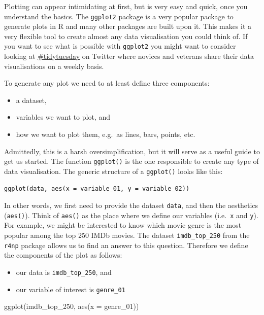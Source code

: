\documentclass[
]{book}
\newenvironment{Shaded}{\begin{snugshade}}{\end{snugshade}}
\newcommand{\AttributeTok}[1]{\textcolor[rgb]{0.77,0.63,0.00}{#1}}
\newcommand{\FunctionTok}[1]{\textcolor[rgb]{0.00,0.00,0.00}{#1}}
\newcommand{\NormalTok}[1]{#1}
\begin{document}
Plotting can appear intimidating at first, but is very easy and quick, once you understand the basics. The \texttt{ggplot2} package is a very popular package to generate plots in R and many other packages are built upon it. This makes it a very flexible tool to create almost any data visualisation you could think of. If you want to see what is possible with \texttt{ggplot2} you might want to consider looking at \href{https://twitter.com/search?q=\%23tidytuesday}{\#tidytuesday} on Twitter where novices and veterans share their data visualisations on a weekly basis.

To generate any plot we need to at least define three components:

\begin{itemize}
\item
  a dataset,
\item
  variables we want to plot, and
\item
  how we want to plot them, e.g.~as lines, bars, points, etc.
\end{itemize}

Admittedly, this is a harsh oversimplification, but it will serve as a useful guide to get us started. The function \texttt{ggplot()} is the one responsible to create any type of data visualisation. The generic structure of a \texttt{ggplot()} looks like this:

\hypertarget{basic_ggplot_structure}{%
\label{basic_ggplot_structure}}%
\begin{verbatim}
ggplot(data, aes(x = variable_01, y = variable_02))
\end{verbatim}

In other words, we first need to provide the dataset \texttt{data}, and then the aesthetics (\texttt{aes()}). Think of \texttt{aes()} as the place where we define our variables (i.e.~\texttt{x} and \texttt{y}). For example, we might be interested to know which movie genre is the most popular among the top 250 IMDb movies. The dataset \texttt{imdb\_top\_250} from the \texttt{r4np} package allows us to find an answer to this question. Therefore we define the components of the plot as follows:

\begin{itemize}
\item
  our data is \texttt{imdb\_top\_250}, and
\item
  our variable of interest is \texttt{genre\_01}
\end{itemize}

\begin{Shaded}
\begin{Highlighting}[]
\FunctionTok{ggplot}\NormalTok{(imdb\_top\_250, }\FunctionTok{aes}\NormalTok{(}\AttributeTok{x =}\NormalTok{ genre\_01))}
\end{Highlighting}
\end{Shaded}
\end{document}
